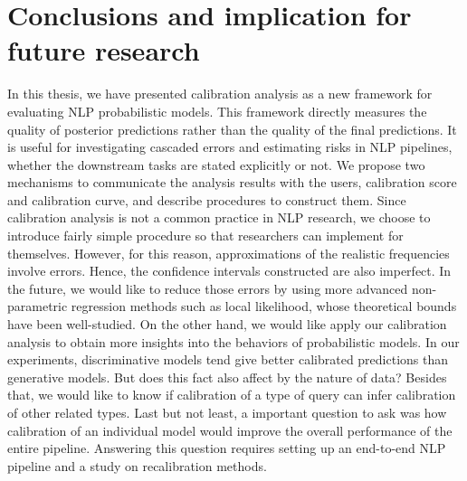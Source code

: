 \chapter{Conclusions and implication for future research}

In this thesis, we have presented calibration analysis as a new framework for evaluating NLP probabilistic models. This framework directly measures the quality of posterior predictions rather than the quality of the final predictions. It is useful for investigating cascaded errors and estimating risks in NLP pipelines, whether the downstream tasks are stated explicitly or not. We propose two mechanisms to communicate the analysis results with the users, calibration score and calibration curve, and describe procedures to construct them. Since calibration analysis is not a common practice in NLP research, we choose to introduce fairly simple procedure so that researchers can implement for themselves. However, for this reason, approximations of the realistic frequencies involve errors. Hence, the confidence intervals constructed are also imperfect. In the future, we would like to reduce those errors by using more advanced non-parametric regression methods such as local likelihood, whose theoretical bounds have been well-studied. On the other hand, we would like apply our calibration analysis to obtain more insights into the behaviors of probabilistic models. In our experiments, discriminative models tend give better calibrated predictions than generative models. But does this fact also affect by the nature of data? Besides that, we would like to know if calibration of a type of query can infer calibration of other related types. Last but not least, a important question to ask was how calibration of an individual model would improve the overall performance of the entire pipeline. Answering this question requires setting up an end-to-end NLP pipeline and a study on recalibration methods.     
